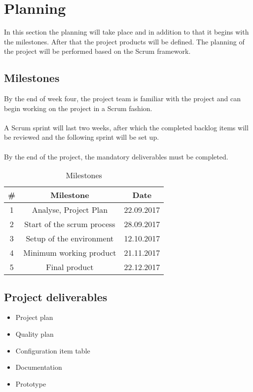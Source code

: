 \section{Planning}
In this section the planning will take place and in addition to that it begins with the milestones.
After that the project products will be defined. The planning of the project will be performed based on the Scrum framework.

    \subsection{Milestones}
    By the end of week four, the project team is familiar with the project and can begin working on the project in a Scrum fashion.\\\\
    A Scrum sprint will last two weeks, after which the completed backlog items will be reviewed and the following sprint will be set up.\\\\
    By the end of the project, the mandatory deliverables must be completed.

    \begin{table}[H]
        \centering
        \begin{tabular}{|c|c|c|}
            \textbf{\#} & \textbf{Milestone}        	& \textbf{Date} \\ \hline \hline
            1           & Analyse, Project Plan     	& 22.09.2017 \\ \hline
            2			& Start of the scrum process	& 28.09.2017 \\ \hline
            3           & Setup of the environment  	& 12.10.2017 \\ \hline
            4           & Minimum working product   	& 21.11.2017 \\ \hline
            5           & Final product   				& 22.12.2017 
        \end{tabular}
        \caption{Milestones}   
    \end{table}
    
    \subsection{Project deliverables}\label{sec:deliverables}
    \begin{itemize}
        \item Project plan
        \item Quality plan
        \item Configuration item table
        \item Documentation
        \item Prototype
    \end{itemize}